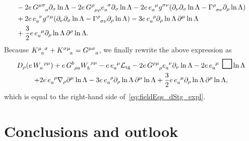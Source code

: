 \documentclass[
final,
11pt,
a4paper,
DIV=11,
headinclude=true,
footinclude=false,
bibliography=totoc,
twoside=true,  %
BCOR=5mm
]{scrbook}
\begin{document}
\begin{subappendices}
\begin{align*}
  \\
  &\hspace{1em}
  - 2e\, G\ind{^{\mu\sigma}_a} \pd_\sigma \ln\Lambda - 2e\, 
  G\ind{^\rho_{\mu\rho}} e\ind{_a^\sigma} \pd_\sigma \ln\Lambda
  - 2e\, e\ind{_a^\mu} g^{\sigma\nu} (\pd_\nu \pd_\sigma 
  \ln\Lambda - \Gamma\ind{^\rho_{\sigma\nu}} \pd_\rho 
  \ln\Lambda)
  \\
  &\hspace{1em}
  + 2e\, e\ind{_a^\nu} g^{\sigma\mu} (\pd_\nu \pd_\sigma 
  \ln\Lambda - \Gamma\ind{^\rho_{\sigma\nu}} \pd_\rho \ln\Lambda) 
  - 3 e\, e\ind{_a^\rho} \pd_\rho \ln \Lambda\, \pd^\mu \ln 
  \Lambda
  \\
  &\hspace{1em}
  + \frac{3}{2} e\, e\ind{_a^\mu} \pd_\rho \ln \Lambda\, \pd^\rho 
  \ln \Lambda.
\end{align*}
Because $K\ind{^\mu_a^\sigma} + K\ind{^{\sigma\mu}_a} 
= G\ind{^{\mu\sigma}_a}$, we finally rewrite the above expression 
as
\begin{multline*}
  D_\rho (e\, W\ind{_a^{\rho\mu}}) + e\, G\ind{^b_{\rho a}} 
  W\ind{_b^{\rho\mu}} - e\, e\ind{_a^\mu} \mathcal{L}_\mrm{tg} 
  - 2e\, G\ind{^{\rho\mu}_\rho} e\ind{_a^\nu} \pd_\nu \ln \Lambda 
  - 2e\, e\ind{_a^\mu} \dal \ln \Lambda
  \\
  +2e\, e\ind{_a^\rho} \nabla_\rho \pd^\mu \ln \Lambda - 3 e\, 
  e\ind{_a^\rho} \pd_\rho \ln \Lambda\, \pd^\mu \ln \Lambda 
  + \frac{3}{2} e\, e\ind{_a^\mu} \pd_\rho \ln \Lambda\, \pd^\rho 
  \ln \Lambda,
\end{multline*}
which is equal to the right-hand side 
of~\eqref{eq:fieldEqs_dStg_expl}.
\end{subappendices}

\begin{comment}
\setchapterpreamble[u]{%
  \dictum[Hannah Arendt, Men in Dark Times]{%
    That even in the darkest of times we have the right to expect 
    some illumination and that such illumination may well come 
    less from theories and concepts than from the uncertain, 
    flickering, and often weak light that some men and women, in 
    their lives and their works, will kindle under almost all 
    circumstances and shed over the time span that was given them 
    on earth.
  }
  \dictumendskip%
}
\end{comment}
\chapter{Conclusions and outlook}
\label{ch:conclusions}
\end{document}
